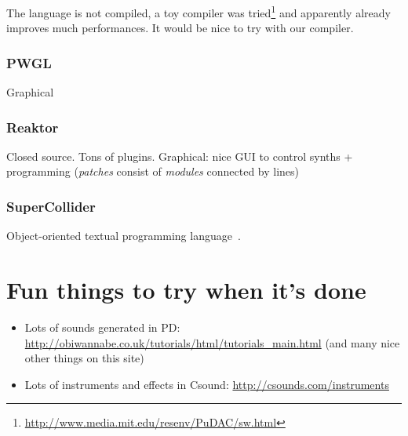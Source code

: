 \documentclass[a4paper,titlepage]{article}
\begin{document}
The language is not compiled, a toy compiler was
tried\footnote{\url{http://www.media.mit.edu/resenv/PuDAC/sw.html}} and
apparently already improves much performances. It would be nice to try with our compiler.

\subsubsection{PWGL}
\cite{pwgl}
Graphical

\subsubsection{Reaktor}
\cite{reaktor} Closed source. Tons of plugins. Graphical: nice GUI to control
synths + programming (\emph{patches} consist of \emph{modules} connected by
lines)

\subsubsection{SuperCollider}
Object-oriented textual programming language~\cite{supercollider}.

\section{Fun things to try when it's done}
\begin{itemize}
\item Lots of sounds generated in PD:
  \url{http://obiwannabe.co.uk/tutorials/html/tutorials_main.html}
  (and many nice other things on this site)
\item Lots of instruments and effects in Csound:
  \url{http://csounds.com/instruments}
\end{itemize}



\end{document}

